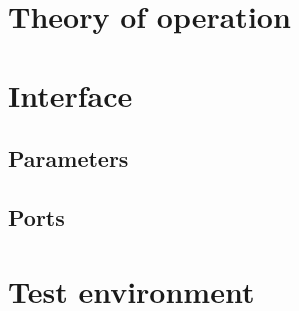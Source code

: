 \section{Theory of operation}
\lipsum[2]

\section{Interface}

\subsection{Parameters}
\lipsum[3]\cite{Johnson}

\subsection{Ports}
\lipsum[4]

\section{Test environment}
\lipsum
